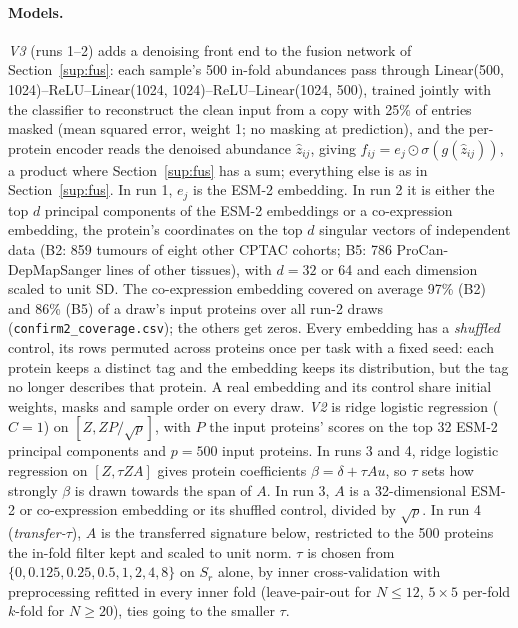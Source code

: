 \documentclass[10pt,letterpaper]{article}
\begin{document}
\paragraph{Models.} \emph{V3} (runs 1--2) adds a denoising front end to the fusion network of
Section~\ref{sup:fus}: each sample's 500 in-fold abundances pass through
Linear(500, 1024)--ReLU--Linear(1024, 1024)--ReLU--Linear(1024, 500), trained jointly with the classifier to
reconstruct the clean input from a copy with 25\% of entries masked (mean squared error, weight 1; no masking
at prediction), and the per-protein encoder reads the denoised abundance $\hat z_{ij}$, giving
$f_{ij} = e_j \odot \sigma(g(\hat z_{ij}))$, a product where Section~\ref{sup:fus} has a sum; everything else
is as in Section~\ref{sup:fus}. In run 1, $e_j$ is
the ESM-2 embedding. In run 2 it is either the top $d$ principal components of the ESM-2 embeddings or a
co-expression embedding, the protein's coordinates on the top $d$ singular vectors of independent data (B2:
859 tumours of eight other CPTAC cohorts; B5: 786 ProCan-DepMapSanger lines of other tissues), with
$d = 32$ or 64 and each dimension scaled to unit SD. The co-expression embedding covered on average 97\% (B2)
and 86\% (B5) of a draw's input proteins over all run-2 draws (\texttt{confirm2\_coverage.csv}); the others get
zeros. Every embedding has a \emph{shuffled} control,
its rows permuted across proteins once per task with a fixed seed: each protein keeps a distinct tag and the
embedding keeps its distribution, but the tag no longer describes that protein. A real embedding and its
control share initial weights, masks and sample order on every draw. \emph{V2} is ridge logistic regression
($C = 1$) on $[Z, ZP/\sqrt{p}]$, with $P$ the input proteins' scores on the top 32 ESM-2 principal components
and $p = 500$ input proteins. In runs 3 and 4, ridge logistic regression on $[Z, \tau ZA]$ gives protein
coefficients $\beta = \delta + \tau A u$, so $\tau$ sets how strongly $\beta$ is drawn towards the span of
$A$. In run 3, $A$ is a 32-dimensional ESM-2 or co-expression embedding or its shuffled control, divided by
$\sqrt{p}$. In run 4 (\emph{transfer-$\tau$}), $A$ is the transferred signature below, restricted to the 500
proteins the in-fold filter kept and scaled to unit norm. $\tau$ is
chosen from $\{0, 0.125, 0.25, 0.5, 1, 2, 4, 8\}$ on $S_r$ alone, by inner cross-validation with
preprocessing refitted in every inner fold (leave-pair-out for $N \le 12$, $5 \times 5$ per-fold $k$-fold for
$N \ge 20$), ties going to the smaller $\tau$.
\end{document}
